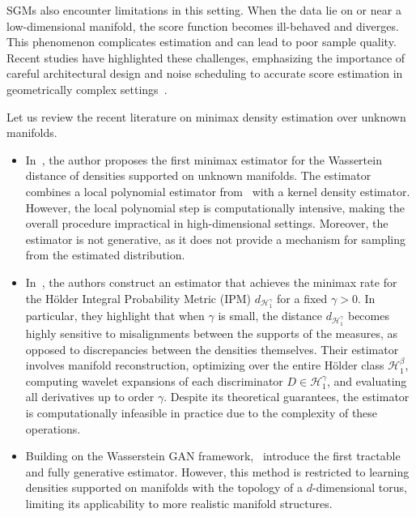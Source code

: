 \documentclass[10pt]{article}
\begin{document}
SGMs also encounter limitations in this setting. When the data lie on or near a low-dimensional manifold, the score function becomes ill-behaved and diverges. This phenomenon complicates estimation and can lead to poor sample quality. Recent studies have highlighted these challenges, emphasizing the importance of careful architectural design and noise scheduling to accurate score estimation in geometrically complex settings~\citep{chen2023score,li2024good}.


Let us review the recent literature on minimax density estimation over unknown manifolds.

\begin{itemize}
    \item In~\cite{divol2022measure}, the author proposes the first minimax estimator for the Wassertein distance of densities supported on unknown manifolds. The estimator combines a local polynomial estimator from~\cite{aamari2017nonasymptotic} with a kernel density estimator. However, the local polynomial step is computationally intensive, making the overall procedure impractical in high-dimensional settings. Moreover, the estimator is not generative, as it does not provide a mechanism for sampling from the estimated distribution.

    \item In~\cite{tang2023minimax}, the authors construct an estimator that achieves the minimax rate for the Hölder Integral Probability Metric (IPM) $d_{\mathcal{H}^\gamma_1}$ for a fixed $\gamma > 0$. In particular, they highlight that when $\gamma$ is small, the distance $d_{\mathcal{H}^\gamma_1}$ becomes highly sensitive to misalignments between the supports of the measures, as opposed to discrepancies between the densities themselves. Their estimator involves manifold reconstruction, optimizing over the entire Hölder class $\mathcal{H}^\beta_1$, computing wavelet expansions of each discriminator $D \in \mathcal{H}^\gamma_1$, and evaluating all derivatives up to order $\gamma$. Despite its theoretical guarantees, the estimator is computationally infeasible in practice due to the complexity of these operations.

    \item Building on the Wasserstein GAN framework,~\cite{stephanovitch2023wasserstein} introduce the first tractable and fully generative estimator. However, this method is restricted to learning densities supported on manifolds with the topology of a $d$-dimensional torus, limiting its applicability to more realistic manifold structures.


\end{itemize}
\end{document}
